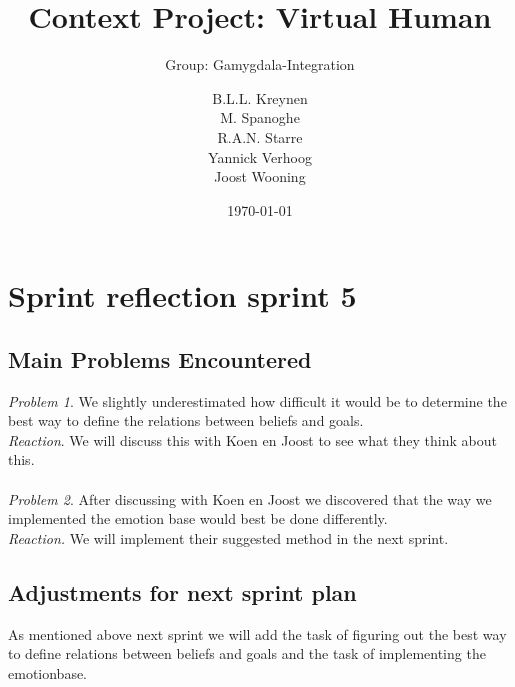 \documentclass{scrartcl}
\begin{document}
\title{Context Project: Virtual Human}
\subtitle{Group: Gamygdala-Integration}
\date{\today{}}

\author{
    \begin{tabular}{l r}
      B.L.L. Kreynen\\
      M. Spanoghe\\
      R.A.N. Starre\\
      Yannick Verhoog\\
      Joost Wooning\\
    \end{tabular}
}

\maketitle \thispagestyle{empty} \pagebreak

\section{Sprint reflection sprint 5}

\subsection{Main Problems Encountered}

\emph{Problem 1}. We slightly underestimated how difficult it would be to determine the best way to define the relations between beliefs and goals.\\
\emph{Reaction}. We will discuss this with Koen en Joost to see what they think about this.\\ \\
\emph{Problem 2}. After discussing with Koen en Joost we discovered that the way we implemented the emotion base would best be done differently. \\
\emph{Reaction.} We will implement their suggested method in the next sprint.
\\

\subsection{Adjustments for next sprint plan}
As mentioned above next sprint we will add the task of figuring out the best way to define relations between beliefs and goals and the task of implementing the emotionbase.
\end{document}
